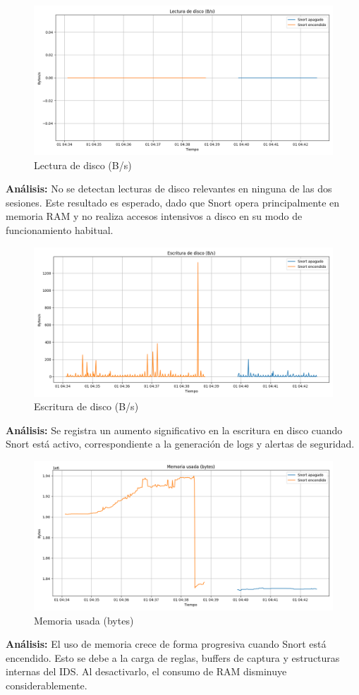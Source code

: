 \documentclass[11pt,a4paper,twoside]{report}
\begin{document}
\begin{figure}[H]
	\centering
	\includegraphics[width=\textwidth]{graficas/disk_read.png}
	\caption{Lectura de disco (B/s)}
\end{figure}
\textbf{Análisis:} No se detectan lecturas de disco relevantes en ninguna de las dos sesiones. Este resultado es esperado, dado que Snort opera principalmente en memoria RAM y no realiza accesos intensivos a disco en su modo de funcionamiento habitual.

\begin{figure}[H]
	\centering
	\includegraphics[width=\textwidth]{graficas/disk_write.png}
	\caption{Escritura de disco (B/s)}
\end{figure}
\textbf{Análisis:} Se registra un aumento significativo en la escritura en disco cuando Snort está activo, correspondiente a la generación de logs y alertas de seguridad.

\begin{figure}[H]
	\centering
	\includegraphics[width=\textwidth]{graficas/mem_used.png}
	\caption{Memoria usada (bytes)}
\end{figure}
\textbf{Análisis:} El uso de memoria crece de forma progresiva cuando Snort está encendido. Esto se debe a la carga de reglas, buffers de captura y estructuras internas del IDS. Al desactivarlo, el consumo de RAM disminuye considerablemente.
\end{document}
